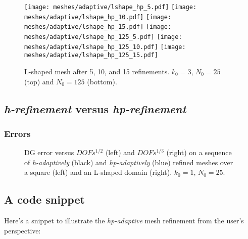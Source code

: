 \begin{figure}[!ht]
	\centering
	\texttt{[image: meshes/adaptive/lshape\_hp\_5.pdf]}
	\texttt{[image: meshes/adaptive/lshape\_hp\_10.pdf]}
	\texttt{[image: meshes/adaptive/lshape\_hp\_15.pdf]}
    \texttt{[image: meshes/adaptive/lshape\_hp\_125\_5.pdf]}
	\texttt{[image: meshes/adaptive/lshape\_hp\_125\_10.pdf]}
	\texttt{[image: meshes/adaptive/lshape\_hp\_125\_15.pdf]}
	\caption{L-shaped mesh after 5, 10, and 15 refinements. $k_0 = 3$, $N_0 = 25$ (top) and $N_0 = 125$ (bottom).}
\end{figure}

\newpage
\subsection{\textit{h-refinement} versus \textit{hp-refinement}}

\subsubsection{Errors}

\begin{figure}[!ht]
    \begin{subfigure}[b]{0.45\textwidth}
		
	\end{subfigure}
	\hfill
	\begin{subfigure}[b]{0.45\textwidth}
		
	\end{subfigure}
    \caption{DG error versus $DOFs^{1/2}$ (left) and $DOFs^{1/3}$ (right) on a sequence of \textit{h-adaptively} (black) and \textit{hp-adaptively} (blue) refined meshes over a square (left) and an L-shaped domain (right). $k_0 = 1$, $N_0 = 25$.}
\end{figure}

\newpage
\subsection{A code snippet}

Here's a snippet to illustrate the \textit{hp-adaptive} mesh refinement from the user's perspective:

